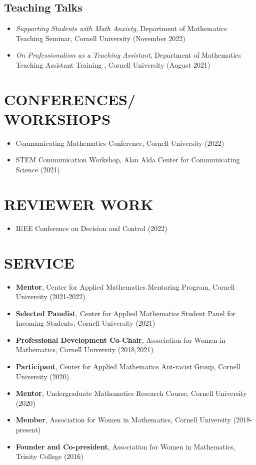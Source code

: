 \documentclass[margin]{res} %
\begin{document}
\begin{resume}
\subsection{Teaching Talks}
\begin{itemize}
\item \textit{Supporting Students with Math Anxiety}, Department of Mathematics Teaching Seminar, Cornell University (November 2022)
\item \textit{On Professionalism as a Teaching Assistant}, Department of Mathematics Teaching Assistant Training , Cornell University (August 2021)
\end{itemize}



\section{CONFERENCES/\\WORKSHOPS}
\begin{itemize}
	\item Communicating Mathematics Conference, Cornell University (2022)
	\item STEM Communication Workshop, Alan Alda Center for Communicating Science (2021)
\end{itemize}

\section{REVIEWER WORK}
\begin{itemize}
	\item IEEE Conference on Decision and Control (2022)
\end{itemize}

\section{SERVICE}
\begin{itemize}
	\item \textbf{Mentor}, Center for Applied Mathematics Mentoring Program, Cornell University (2021-2022)
        \item \textbf{Selected Panelist}, Center for Applied Mathematics Student Panel for Incoming Students, Cornell University (2021)
	\item \textbf{Professional Development Co-Chair}, Association for Women in Mathematics, Cornell University (2018,2021)
        \item \textbf{Participant}, Center for Applied Mathematics Ant-racist Group, Cornell University (2020)
        \item \textbf{Mentor}, Undergraduate Mathematics Research Course, Cornell University (2020)
	\item \textbf{Member}, Association for Women in Mathematics, Cornell University (2018-present)
        \item \textbf{Founder and Co-president}, Association for Women in Mathematics, Trinity College (2016)
\end{itemize}




\end{resume}
\end{document}
